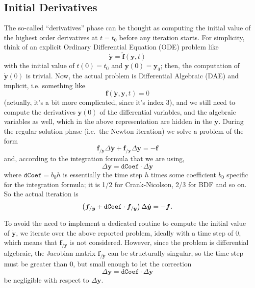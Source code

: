 \documentclass[10pt,dvips,fleqn,subeqn]{report}
\newcommand{\T}[1]{\bm{#1}}
\begin{document}
\subsection{Initial Derivatives}
The so-called ``derivatives'' phase can be thought as computing
the initial value of the highest order derivatives at $t=t_0$
before any iteration starts.
For simplicity, think of an explicit Ordinary Differential Equation
(ODE) problem like
\begin{equation}
	\dot{\T{y}} = \hat{\T{f}}(\T{y}, t)
\end{equation}
with the initial value of $t(0) = t_0$ and $\T{y}(0) = \T{y}_0$; 
then, the computation of $\dot{\T{y}}(0)$ is trivial.  
Now, the actual problem is Differential Algebraic (DAE) and implicit, 
i.e. something like
\begin{equation}
  \T{f}(\dot{\T{y}}, \T{y}, t) = 0
\end{equation}
(actually, it's a bit more complicated, since it's index 3), 
and we still need to compute the derivatives $\dot{\T{y}}(0)$ 
of the differential variables, and the algebraic variables as well, 
which in the above representation are hidden in the $\dot{\T{y}}$.
During the regular solution phase (i.e.\ the Newton iteration) 
we solve a problem of the form
\begin{equation}
  \T{f}_{/\dot{\T{y}}} \Delta \dot{\T{y}} + \T{f}_{/\T{y}} \Delta \T{y} = - \T{f}
\end{equation}
and, according to the integration formula that we are using,
\begin{equation}
  \Delta \T{y} = \texttt{dCoef} \cdot \Delta \dot{\T{y}}
\end{equation}
where $\texttt{dCoef} = b_0 h$ is essentially the time step $h$
times some coefficient $b_0$ specific for the integration formula;
it is 1/2 for Crank-Nicolson, 2/3 for BDF and so on.
So the actual iteration is
\begin{equation}
	\plbr{\T{f}_{/\dot{\T{y}}} + \texttt{dCoef} \cdot \T{f}_{/\T{y}} } \Delta \dot{\T{y}} = - \T{f}
	\label{eq:derivatives:iteration}
	.
\end{equation}

To avoid the need to implement a dedicated routine to compute 
the initial value of $\dot{\T{y}}$, we iterate over the above reported problem, 
ideally with a time step of $0$, which means that $\T{f}_{/\T{y}}$ is not considered.  
However, since the problem is differential algebraic, 
the Jacobian matrix $\T{f}_{/\dot{\T{y}}}$ can be structurally singular,
so the time step must be greater than $0$, but small enough to let the correction
\begin{equation}
	\Delta \T{y} = \texttt{dCoef} \cdot \Delta \dot{\T{y}}
	\label{eq:derivatives:dcoef}
\end{equation}
be negligible with respect to $\Delta \dot{\T{y}}$.  
\end{document}
